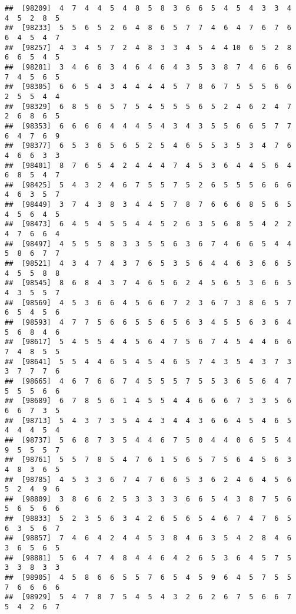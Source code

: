 \documentclass[
]{book}
\begin{document}
\begin{verbatim}
##  [98209]  4  7  4  4  5  4  8  5  8  3  6  6  5  4  5  4  3  3  4  4  5  2  8  5
##  [98233]  5  5  6  5  2  6  4  8  6  5  7  7  4  6  4  7  6  7  6  6  4  5  4  7
##  [98257]  4  3  4  5  7  2  4  8  3  3  4  5  4  4 10  6  5  2  8  6  6  5  4  5
##  [98281]  3  4  6  6  3  4  6  4  6  4  3  5  3  8  7  4  6  6  6  7  4  5  6  5
##  [98305]  6  6  5  4  3  4  4  4  4  5  7  8  6  7  5  5  5  6  6  2  5  5  4  4
##  [98329]  6  8  5  6  5  7  5  4  5  5  5  6  5  2  4  6  2  4  7  2  6  8  6  5
##  [98353]  6  6  6  6  4  4  4  5  4  3  4  3  5  5  6  6  5  7  7  6  4  7  6  9
##  [98377]  6  5  3  6  5  6  5  2  5  4  6  5  5  3  5  3  4  7  6  4  6  6  3  3
##  [98401]  8  7  6  5  4  2  4  4  4  7  4  5  3  6  4  4  5  6  4  6  8  5  4  7
##  [98425]  5  4  3  2  4  6  7  5  5  7  5  2  6  5  5  5  6  6  6  4  6  3  5  7
##  [98449]  3  7  4  3  8  3  4  4  5  7  8  7  6  6  6  8  5  6  5  4  5  6  4  5
##  [98473]  6  4  5  4  5  5  4  4  5  2  6  3  5  6  8  5  4  2  2  4  7  6  6  4
##  [98497]  4  5  5  5  8  3  3  5  5  6  3  6  7  4  6  6  5  4  4  5  8  6  7  7
##  [98521]  4  3  4  7  4  3  7  6  5  3  5  6  4  4  6  3  6  6  5  4  5  5  8  8
##  [98545]  8  6  8  4  3  7  4  6  5  6  2  4  5  6  5  3  6  6  5  4  3  5  5  7
##  [98569]  4  5  3  6  6  4  5  6  6  7  2  3  6  7  3  8  6  5  7  6  5  4  5  6
##  [98593]  4  7  7  5  6  6  5  5  6  5  6  3  4  5  5  6  3  6  4  5  6  8  4  6
##  [98617]  5  4  5  5  4  4  5  6  4  7  5  6  7  4  5  4  4  6  6  7  4  8  5  5
##  [98641]  5  5  4  4  6  5  4  5  4  6  5  7  4  3  5  4  3  7  3  3  7  7  7  6
##  [98665]  4  6  7  6  6  7  4  5  5  5  7  5  5  3  6  5  6  4  7  5  5  5  6  6
##  [98689]  6  7  8  5  6  1  4  5  5  4  4  6  6  6  7  3  3  5  6  6  6  7  3  5
##  [98713]  5  4  3  7  3  5  4  4  3  4  4  3  6  6  4  5  4  6  5  4  4  4  5  4
##  [98737]  5  6  8  7  3  5  4  4  6  7  5  0  4  4  0  6  5  5  4  9  5  5  5  7
##  [98761]  5  5  7  8  5  4  7  6  1  5  6  5  7  5  6  4  5  6  3  4  8  3  6  5
##  [98785]  4  5  3  3  6  7  4  7  6  6  5  3  6  2  4  6  4  5  6  5  2  4  9  6
##  [98809]  3  8  6  6  2  5  3  3  3  3  6  6  5  4  3  8  7  5  6  5  6  5  6  6
##  [98833]  5  2  3  5  6  3  4  2  6  5  6  5  4  6  7  4  7  6  5  6  3  5  6  7
##  [98857]  7  4  6  4  2  4  4  5  3  8  4  6  3  5  4  2  8  4  6  3  6  5  6  5
##  [98881]  5  6  4  7  4  8  4  4  6  4  2  6  5  3  6  4  5  7  5  3  3  8  3  3
##  [98905]  4  5  8  6  6  5  5  7  6  5  4  5  9  6  4  5  7  5  5  7  6  6  6  6
##  [98929]  5  4  7  8  7  5  4  5  4  3  2  6  2  6  7  5  6  6  7  5  4  2  6  7

\end{verbatim}
\end{document}
